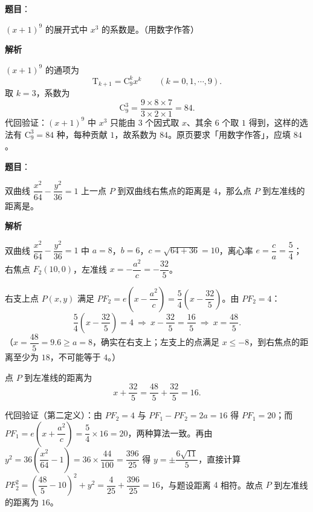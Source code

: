 \begin{answer}

\textbf{题目}：

$(x+1)^9$ 的展开式中 $x^3$ 的系数是\gkblank{}。（用数字作答）

\textbf{解析}

$(x+1)^9$ 的通项为
\nopagebreak[4]
\[
\mathrm T_{k+1}=\mathrm C_9^k x^k\qquad(k=0,1,\cdots,9).
\]
取 $k=3$，系数为
\nopagebreak[4]
\[
\mathrm C_9^3=\frac{9\times8\times7}{3\times2\times1}=84.
\]
代回验证：$(x+1)^9$ 中 $x^3$ 只能由 $3$ 个因式取 $x$、其余 $6$ 个取 $1$ 得到，这样的选法有 $\mathrm C_9^3=84$ 种，每种贡献 $1$，故系数为 $84$。原页要求「用数字作答」，应填 $84$。


\end{answer}
\begin{answer}

\textbf{题目}：

双曲线 $\dfrac{x^2}{64}-\dfrac{y^2}{36}=1$ 上一点 $P$ 到双曲线右焦点的距离是 $4$，那么点 $P$ 到左准线的距离是\gkblank{}。

\textbf{解析}

双曲线 $\dfrac{x^2}{64}-\dfrac{y^2}{36}=1$ 中 $a=8$，$b=6$，$c=\sqrt{64+36}=10$，离心率 $e=\dfrac ca=\dfrac54$；右焦点 $F_2(10,0)$，左准线 $x=-\dfrac{a^2}{c}=-\dfrac{32}{5}$。

右支上点 $P(x,y)$ 满足 $PF_2=e\left(x-\dfrac{a^2}{c}\right)=\dfrac54\left(x-\dfrac{32}{5}\right)$。由 $PF_2=4$：
\nopagebreak[4]
\[
\frac54\left(x-\frac{32}{5}\right)=4\ \Longrightarrow\ x-\frac{32}{5}=\frac{16}{5}\ \Longrightarrow\ x=\frac{48}{5}.
\]
（$x=\dfrac{48}{5}=9.6\geqslant a=8$，确实在右支上；左支上的点满足 $x\leqslant-8$，到右焦点的距离至少为 $18$，不可能等于 $4$。）

点 $P$ 到左准线的距离为
\nopagebreak[4]
\[
x+\frac{32}{5}=\frac{48}{5}+\frac{32}{5}=16.
\]

代回验证（第二定义）：由 $PF_2=4$ 与 $PF_1-PF_2=2a=16$ 得 $PF_1=20$；而 $PF_1=e\left(x+\dfrac{a^2}{c}\right)=\dfrac54\times16=20$，两种算法一致。再由 $y^2=36\left(\dfrac{x^2}{64}-1\right)=36\times\dfrac{44}{100}=\dfrac{396}{25}$ 得 $y=\pm\dfrac{6\sqrt{11}}{5}$，直接计算 $PF_2^2=\left(\dfrac{48}{5}-10\right)^2+y^2=\dfrac{4}{25}+\dfrac{396}{25}=16$，与题设距离 $4$ 相符。故点 $P$ 到左准线的距离为 $16$。


\end{answer}

